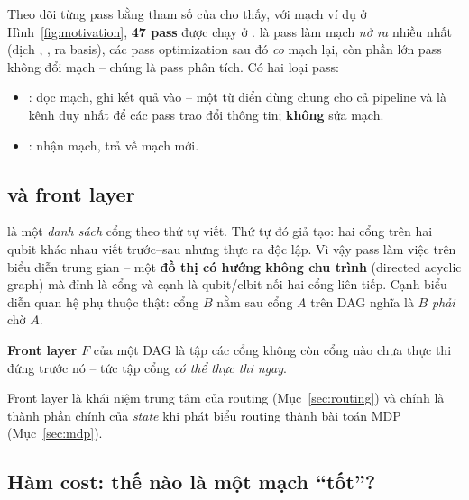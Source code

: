 Theo dõi từng pass bằng tham số  của  cho thấy, với mạch ví dụ ở
Hình~\ref{fig:motivation}, \textbf{47 pass} được chạy ở .
 là pass làm mạch \emph{nở ra} nhiều nhất (dịch , ,
 ra basis), các pass optimization sau đó \emph{co} mạch lại, còn phần lớn pass không đổi
mạch -- chúng là pass phân tích. Có hai loại pass:
\begin{itemize}[noitemsep]
  \item {}: đọc mạch, ghi kết quả vào  -- một từ điển dùng
    chung cho cả pipeline và là kênh duy nhất để các pass trao đổi thông tin; \textbf{không} sửa mạch.
  \item {}: nhận mạch, trả về mạch mới.
\end{itemize}

\subsection{ và front layer}

 là một \emph{danh sách} cổng theo thứ tự viết. Thứ tự đó giả tạo: hai cổng trên
hai qubit khác nhau viết trước--sau nhưng thực ra độc lập. Vì vậy pass làm việc trên biểu diễn trung
gian  -- một \textbf{đồ thị có hướng không chu trình} (directed acyclic graph) mà
đỉnh là cổng và cạnh là qubit/clbit nối hai cổng liên tiếp. Cạnh biểu diễn quan hệ phụ thuộc thật:
cổng $B$ nằm sau cổng $A$ trên DAG nghĩa là $B$ \emph{phải} chờ $A$.

\begin{definition}
\textbf{Front layer} $F$ của một DAG là tập các cổng không còn cổng nào chưa thực thi đứng trước nó
-- tức tập cổng \emph{có thể thực thi ngay}.
\end{definition}

Front layer là khái niệm trung tâm của routing (Mục~\ref{sec:routing}) và chính là thành phần chính
của \emph{state} khi phát biểu routing thành bài toán MDP (Mục~\ref{sec:mdp}).

\subsection{Hàm cost: thế nào là một mạch ``tốt''?}
\label{sec:cost}

